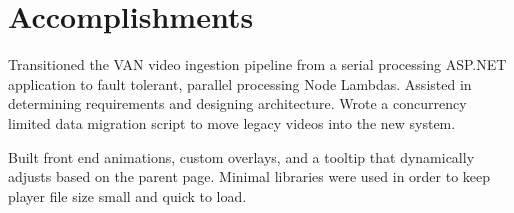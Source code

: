 \documentclass[]{deedy-resume-openfont}
\begin{document}
\section{Accomplishments}
Transitioned the VAN video ingestion pipeline from a serial processing ASP.NET application to fault tolerant, parallel processing Node Lambdas. Assisted in determining requirements and designing architecture. Wrote a concurrency limited data migration script to move legacy videos into the new system.
\sectionsep

Built front end animations, custom overlays, and a tooltip that dynamically adjusts based on the parent page. Minimal libraries were used in order to keep player file size small and quick to load.
\sectionsep
\end{document}
